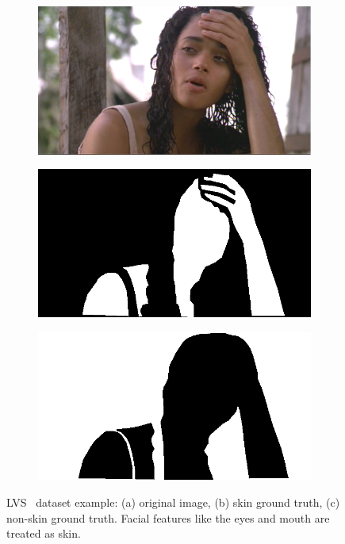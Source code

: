 \begin{figure}[h]
     \centering
     \begin{subfigure}[b]{0.3\textwidth}
         \centering
         \includegraphics[width=\textwidth]{images/datasets/frame.25.png}
         \caption{}
         \label{fig:lvs-gt-x}
     \end{subfigure}
     \hfill
     \begin{subfigure}[b]{0.3\textwidth}
         \centering
         \includegraphics[width=\textwidth]{images/datasets/skin.25.png}
         \caption{}
         \label{fig:lvs-gt-skin}
     \end{subfigure}
    \hfill
     \begin{subfigure}[b]{0.3\textwidth}
         \centering
         \includegraphics[width=\textwidth]{images/datasets/background.25.png}
         \caption{}
         \label{fig:lvs-gt-noskin}
     \end{subfigure}
        \caption{LVS~\cite{jones2002statistical} dataset example: (a) original image, (b) skin ground truth, (c) non-skin ground truth.
        Facial features like the eyes and mouth are treated as skin.}
        \label{fig:lvs-gt}
\end{figure}


